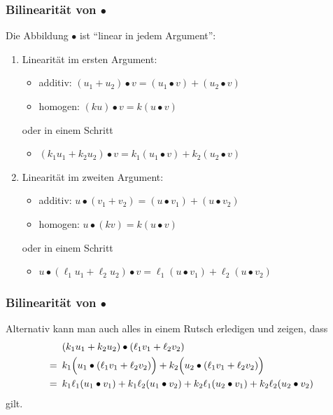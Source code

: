 \documentclass{beamer}
\begin{document}
\begin{frame} \frametitle{Bilinearität von $\bullet$}
    Die Abbildung $\bullet$ ist \enquote{linear in jedem Argument}:
    \begin{enumerate}
        \item Linearität im ersten Argument:
        \begin{itemize}
            \item additiv: $(u_1 + u_2) \bullet v = (u_1 \bullet v) + (u_2 \bullet v)$
            \item homogen: $(k u) \bullet v = k (u \bullet v)$
        \end{itemize}
        \smallskip oder in einem Schritt \smallskip
        \begin{itemize}
            \item $(k_1 u_1 + k_2 u_2) \bullet v = k_1 (u_1 \bullet v) + k_2 (u_2 \bullet v)$
        \end{itemize}
        \medskip
        \item Linearität im zweiten Argument:
        \begin{itemize}
            \item additiv: $u \bullet (v_1 + v_2) = (u \bullet v_1) + (u \bullet v_2)$
            \item homogen: $u \bullet (k v) = k (u \bullet v)$
        \end{itemize}
        \smallskip oder in einem Schritt \smallskip
        \begin{itemize}
            \item $u \bullet (\ell_1 u_1 + \ell_2 u_2) \bullet v = \ell_1 (u \bullet v_1) + \ell_2 (u \bullet v_2)$
        \end{itemize}
    \end{enumerate}
\end{frame}

\begin{frame} \frametitle{Bilinearität von $\bullet$}
    Alternativ kann man auch alles in einem Rutsch erledigen und zeigen, dass
    \begin{align*}
        &(k_1 u_1 + k_2 u_2) \bullet (\ell_1 v_1 + \ell_2 v_2) \\
        = \enskip
        &
        k_1 \Big(u_1 \bullet (\ell_1 v_1 + \ell_2 v_2) \Big) + k_2 \Big(u_2 \bullet (\ell_1 v_1 + \ell_2 v_2) \Big) \\
        = \enskip
        &
        k_1 \ell_1 (u_1 \bullet v_1) + k_1 \ell_2 (u_1 \bullet v_2) + k_2 \ell_1 (u_2 \bullet v_1) + k_2 \ell_2 (u_2 \bullet v_2)
    \end{align*}
    gilt.
\end{frame}
\end{document}
